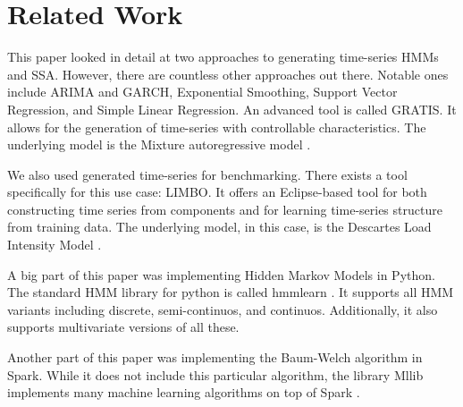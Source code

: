 \chapter{Related Work}\label{chapter:related}

This paper looked in detail at two approaches to generating time-series HMMs and SSA. However, there are countless other approaches out there. Notable ones include ARIMA and GARCH, Exponential Smoothing, Support Vector Regression, and Simple Linear Regression\parencite{inproceedings}. An advanced tool is called GRATIS. It allows for the generation of time-series with controllable characteristics. The underlying model is the Mixture autoregressive model \parencite{kang2019gratis}.

We also used generated time-series for benchmarking. There exists a tool specifically for this use case: LIMBO. It offers an Eclipse-based tool for both constructing time series from components and for learning time-series structure from training data. The underlying model, in this case, is the Descartes Load Intensity Model \parencite{v2014limbo}.

A big part of this paper was implementing Hidden Markov Models in Python. The standard HMM library for python is called hmmlearn \parencite{weiss2019hmmlearn}. It supports all HMM variants including discrete, semi-continuos, and continuos. Additionally, it also supports multivariate versions of all these. 

Another part of this paper was implementing the Baum-Welch algorithm in Spark. While it does not include this particular algorithm, the library Mllib implements many machine learning algorithms on top of Spark \parencite{meng2016mllib}.
